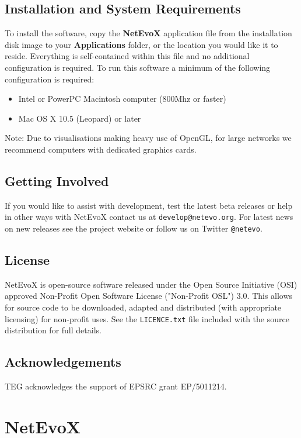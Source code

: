 \documentclass[a4paper, 11pt]{article}
\newcommand{\guitxt}[1]{{\textbf{\textsf{\small{#1}}}}}
\begin{document}
\subsection{Installation and System Requirements}
To install the software, copy the \guitxt{NetEvoX} application file from the installation disk image to your \guitxt{Applications} folder, or the location you would like it to reside. Everything is self-contained within this file and no additional configuration is required. To run this software a minimum of the following configuration is required:
\begin{itemize}
	\item Intel or PowerPC Macintosh computer (800Mhz or faster)
	\item Mac OS X 10.5 (Leopard) or later
\end{itemize}
Note: Due to visualisations making heavy use of OpenGL, for large networks we recommend computers with dedicated graphics cards.

\subsection{Getting Involved}
If you would like to assist with development, test the latest beta releases or help in other ways with NetEvoX contact us at \texttt{develop@netevo.org}. For latest news on new releases see the project website or follow us on Twitter \texttt{@netevo}.

\subsection{License}
NetEvoX is open-source software released under the Open Source Initiative (OSI) approved Non-Profit Open Software License ("Non-Profit OSL") 3.0. This allows for source code to be downloaded, adapted and distributed (with appropriate licensing) for non-profit uses. See the \texttt{LICENCE.txt} file included with the source distribution for full details.

\subsection*{Acknowledgements}
TEG acknowledges the support of EPSRC grant EP/5011214.

\section{NetEvoX}
\end{document}
